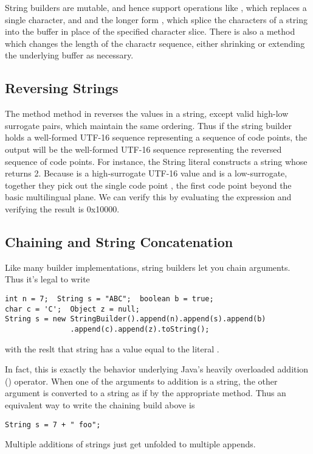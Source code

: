 String builders are mutable, and hence support operations like
, which replaces a single character, and
 and the longer form
, which splice the characters of a
string into the buffer in place of the specified character slice.
There is also a  method which changes the length
of the charactr sequence, either shrinking or extending the underlying
buffer as necessary.

\subsection{Reversing Strings}

The method  method in  reverses
the  values in a string, except valid high-low surrogate
pairs, which maintain the same ordering.  Thus if the string builder
holds a well-formed UTF-16 sequence representing a sequence of code
points, the output will be the well-formed UTF-16 sequence
representing the reversed sequence of code points.  For instance, the
String literal  constructs a string whose
 returns 2.  Because  is a
high-surrogate UTF-16  value and  is a
low-surrogate, together they pick out the single code point
, the first code point beyond the basic multilingual
plane.  We can verify this by evaluating the expression
 and verifying the result 
is 0x10000.


\subsection{Chaining and String Concatenation}

Like many builder implementations, string builders let you chain
arguments.  Thus it's legal to write
%
\begin{verbatim}
int n = 7;  String s = "ABC";  boolean b = true;  
char c = 'C';  Object z = null;
String s = new StringBuilder().append(n).append(s).append(b)
               .append(c).append(z).toString();
\end{verbatim}
%
with the reslt that string  has a value equal to the
literal .

In fact, this is exactly the behavior underlying Java's heavily
overloaded addition (\code{+}) operator.  When one of the arguments to
addition is a string, the other argument is converted to a string as
if by the appropriate  method.  Thus an
equivalent way to write the chaining build above is
%
\begin{verbatim}
String s = 7 + " foo";
\end{verbatim}
%
Multiple additions of strings just get unfolded to multiple appends.


